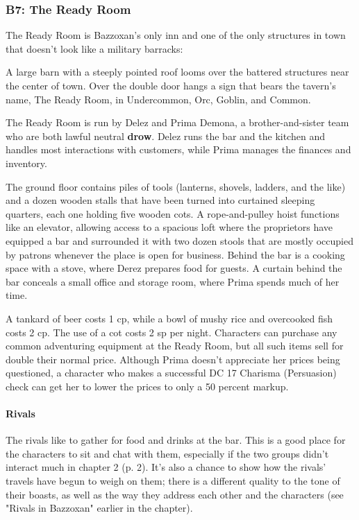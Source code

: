 \documentclass[letterpaper, 11pt, bg=full, twocolumn]{dndbook}
\begin{document}
\subsubsection{B7: The Ready Room}

The Ready Room is Bazzoxan's only inn and one of the only structures in town that doesn't look like a military barracks:

\begin{DndReadAloud}
A large barn with a steeply pointed roof looms over the battered structures near the center of town. Over the double door hangs a sign that bears the tavern's name, The Ready Room, in Undercommon, Orc, Goblin, and Common.
\end{DndReadAloud}

The Ready Room is run by Delez and Prima Demona, a brother-and-sister team who are both lawful neutral \textbf{drow}. Delez runs the bar and the kitchen and handles most interactions with customers, while Prima manages the finances and inventory.

The ground floor contains piles of tools (lanterns, shovels, ladders, and the like) and a dozen wooden stalls that have been turned into curtained sleeping quarters, each one holding five wooden cots. A rope-and-pulley hoist functions like an elevator, allowing access to a spacious loft where the proprietors have equipped a bar and surrounded it with two dozen stools that are mostly occupied by patrons whenever the place is open for business. Behind the bar is a cooking space with a stove, where Derez prepares food for guests. A curtain behind the bar conceals a small office and storage room, where Prima spends much of her time.

A tankard of beer costs 1 cp, while a bowl of mushy rice and overcooked fish costs 2 cp. The use of a cot costs 2 sp per night. Characters can purchase any common adventuring equipment at the Ready Room, but all such items sell for double their normal price. Although Prima doesn't appreciate her prices being questioned, a character who makes a successful DC 17 Charisma (Persuasion) check can get her to lower the prices to only a 50 percent markup.

\paragraph{Rivals}

The rivals like to gather for food and drinks at the bar. This is a good place for the characters to sit and chat with them, especially if the two groups didn't interact much in chapter 2 (p. 2). It's also a chance to show how the rivals' travels have begun to weigh on them; there is a different quality to the tone of their boasts, as well as the way they address each other and the characters (see "Rivals in Bazzoxan" earlier in the chapter).
\end{document}
